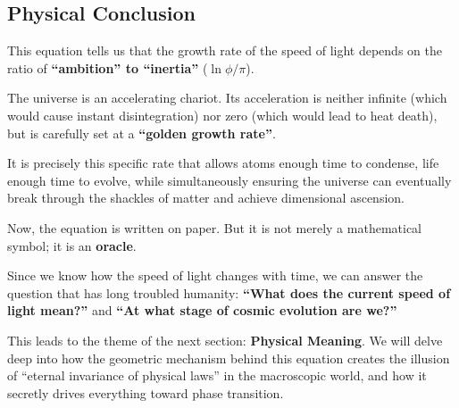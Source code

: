 \subsection{Physical Conclusion}

This equation tells us that the growth rate of the speed of light depends on the ratio of \textbf{``ambition'' to ``inertia''} ($\ln \phi / \pi$).

The universe is an accelerating chariot. Its acceleration is neither infinite (which would cause instant disintegration) nor zero (which would lead to heat death), but is carefully set at a \textbf{``golden growth rate''}.

It is precisely this specific rate that allows atoms enough time to condense, life enough time to evolve, while simultaneously ensuring the universe can eventually break through the shackles of matter and achieve dimensional ascension.

Now, the equation is written on paper. But it is not merely a mathematical symbol; it is an \textbf{oracle}.

Since we know how the speed of light changes with time, we can answer the question that has long troubled humanity: \textbf{``What does the current speed of light mean?''} and \textbf{``At what stage of cosmic evolution are we?''}

This leads to the theme of the next section: \textbf{Physical Meaning}. We will delve deep into how the geometric mechanism behind this equation creates the illusion of ``eternal invariance of physical laws'' in the macroscopic world, and how it secretly drives everything toward phase transition.

